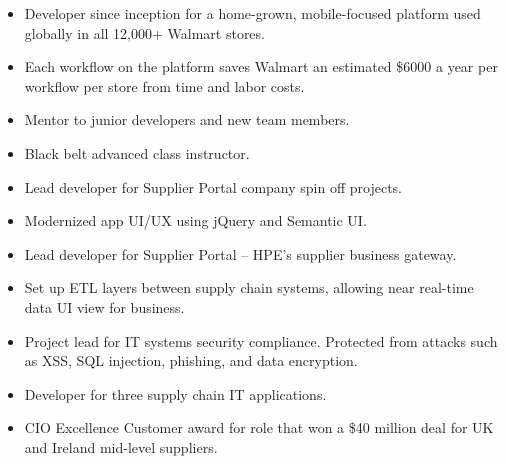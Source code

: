 \documentclass[10pt,a4paper]{resume}
\begin{document}

\begin{itemize}
\item Developer since inception for a home-grown, mobile-focused platform used globally in all 12,000+ Walmart stores.
\item Each workflow on the platform saves Walmart an estimated \$6000 a year per workflow per store from time and labor costs.
\item Mentor to junior developers and new team members.
\end{itemize}

\divider

\begin{itemize}
\item Black belt advanced class instructor.
\end{itemize}

\divider

\begin{itemize}
\item Lead developer for Supplier Portal company spin off projects.
\item Modernized app UI/UX using jQuery and Semantic UI.
\end{itemize}

\divider

\begin{itemize}
\item Lead developer for Supplier Portal -- HPE's supplier business gateway.
\item Set up ETL layers between supply chain systems, allowing near real-time data UI view for business.
\item Project lead for IT systems security compliance. Protected from attacks such as XSS, SQL injection, phishing, and data encryption.
\end{itemize}

\divider

\begin{itemize}
\item Developer for three supply chain IT applications.
\item CIO Excellence Customer award for role that won a \$40 million deal for UK and Ireland mid-level suppliers.

\end{itemize}
\end{document}

